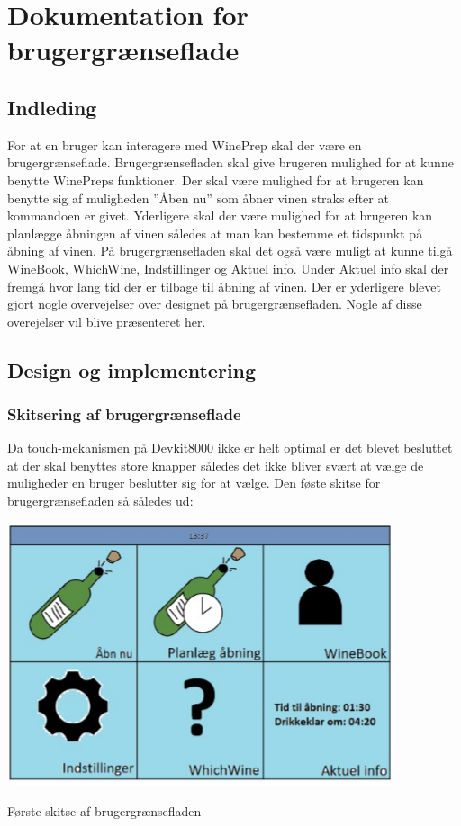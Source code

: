 \chapter*{Dokumentation for brugergrænseflade}

\section*{Indleding}

For at en bruger kan interagere med WinePrep skal der være en brugergrænseflade. Brugergrænsefladen skal give brugeren mulighed for at kunne benytte WinePreps funktioner. Der skal være mulighed for at brugeren kan benytte sig af muligheden ”Åben nu” som åbner vinen straks efter at kommandoen er givet. Yderligere skal der være mulighed for at brugeren kan planlægge åbningen af vinen således at man kan bestemme et tidspunkt på åbning af vinen. På brugergrænsefladen skal det også være muligt at kunne tilgå WineBook, WhíchWine, Indstillinger og Aktuel info. Under Aktuel info skal der fremgå hvor lang tid der er tilbage til åbning af vinen. Der er yderligere blevet gjort nogle overvejelser over designet på brugergrænsefladen. Nogle af disse overejelser vil blive præsenteret her.

\section*{Design og implementering}
\subsection*{Skitsering af brugergrænseflade}

Da touch-mekanismen på Devkit8000 ikke er helt optimal er det blevet besluttet at der skal benyttes store knapper således det ikke bliver svært at vælge de muligheder en bruger beslutter sig for at vælge. Den føste skitse for brugergrænsefladen så således ud:

\includegraphics{Billeder/skitse}
\caption{Første skitse af brugergrænsefladen}

